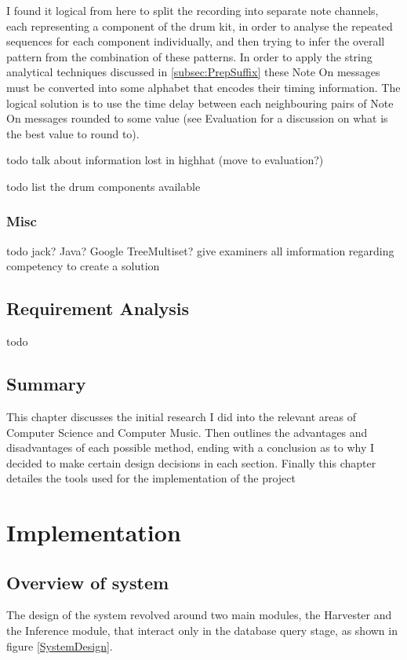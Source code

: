 \documentclass[12pt,twoside,notitlepage]{report}
\begin{document}
			I found it logical from here to split the recording into separate note channels, each representing a component of the drum kit, in order to analyse the repeated sequences for each component individually, and then trying to infer the overall pattern from the combination of these patterns. In order to apply the string analytical techniques discussed in \ref{subsec:PrepSuffix} these Note On messages must be converted into some alphabet that encodes their timing information. The logical solution is to use the time delay between each neighbouring pairs of Note On messages rounded to some value (see Evaluation for a discussion on what is the best value to round to).
			
			todo talk about information lost in highhat (move to evaluation?)
			
			todo list the drum components available
			
		\subsection{Misc}
		todo jack? Java? Google TreeMultiset? give examiners all imformation regarding competency to create a solution
		
	\section{Requirement Analysis}
	todo
	\section{Summary}
	This chapter discusses the initial research I did into the relevant areas of Computer Science and Computer Music. Then outlines the advantages and disadvantages of each possible method, ending with a conclusion as to why I decided to make certain design decisions in each section. Finally this chapter detailes the tools used for the implementation of the project
\cleardoublepage
\chapter{Implementation}
	\section{Overview of system}	
	
	The design of the system revolved around two main modules, the Harvester and the Inference module, that interact only in the database query stage, as shown in figure \ref{SystemDesign}. 
	
\end{document}
